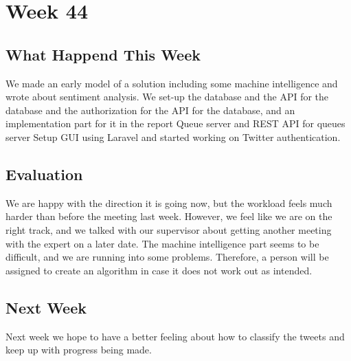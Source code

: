 \section*{Week 44}
\subsection*{What Happend This Week}
We made an early model of a solution including some machine intelligence and
wrote about sentiment analysis. We set-up the database and the \ac{API} for the
database and the authorization for the \ac{API} for the database, and an
implementation part for it in the report Queue server and \ac{REST} \ac{API} for
queues server Setup \ac{GUI} using Laravel and started working on Twitter
authentication.

\subsection*{Evaluation}
We are happy with the direction it is going now, but the workload feels much
harder than before the meeting last week. However, we feel like we are on the
right track, and we talked with our supervisor about getting another meeting
with the expert on a later date. The machine intelligence part seems to be
difficult, and we are running into some problems. Therefore, a person will be
assigned to create an algorithm in case it does not work out as intended.

\subsection*{Next Week} 
Next week we hope to have a better feeling about how to classify the tweets and
keep up with progress being made.

